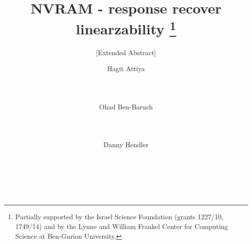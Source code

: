 \documentclass{sig-alternate-2013}
\begin{document}
	
	\title{NVRAM - response recover linearzability \thanks{
                Partially supported by the Israel Science Foundation
                (grants 1227/10, 1749/14) and by the Lynne and William Frankel Center for Computing Science at Ben-Gurion University.}}
	\subtitle{[Extended Abstract]}
	
	
	\author{
		\alignauthor
		Hagit Attiya\\
		\\
		\\
		\\
		\alignauthor
		Ohad Ben-Baruch\\
		\\
		\\
		\\
		\alignauthor
		Danny Hendler\\
		\\
		\\
		\\
	}
	
	\maketitle	
	
	
	
	
	
	


	
	
\end{document}
